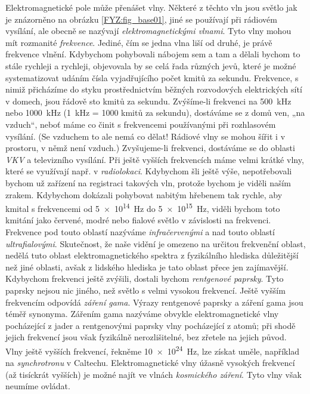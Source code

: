     Elektromagnetické pole může přenášet vlny. Některé z těchto vln jsou světlo jak je znázorněno na obrázku 
    \ref{FYZ:fig_base01}, jiné se používají při rádiovém vysílání, ale obecně se nazývají 
    \emph{elektromagnetickými vlnami}. Tyto vlny mohou mít rozmanité \emph{frekvence}. Jediné, čím se jedna 
    vlna liší od druhé, je právě frekvence vlnění. Kdybychom pohybovali nábojem sem a tam a dělali bychom to 
    stále rychleji a rychleji, objevovala by se celá řada různých jevů, které je možné systematizovat udáním 
    čísla vyjadřujícího počet kmitů za sekundu. Frekvence, s nimiž přicházíme do styku prostřednictvím 
    běžných rozvodových elektrických sítí v domech, jsou řádově sto kmitů za sekundu. Zvýšíme-li frekvenci na 
    \SI{500}{\kHz} nebo \SI{1000}{\kHz} (\SI{1}{\kHz} = 1000 kmitů za sekundu), dostáváme se z domů ven, „na 
    vzduch“, neboť máme co činit s frekvencemi používanými při rozhlasovém vysílání. (Se vzduchem to ale nemá 
    co dělat! Rádiové vlny se mohou šířit i v prostoru, v němž není vzduch.) Zvyšujeme-li frekvenci, 
    dostáváme se do oblasti \emph{VKV} a televizního vysílání. Při ještě vyšších frekvencích máme velmi 
    krátké vlny, které se využívají např. v \emph{radiolokaci}. Kdybychom šli ještě výše, nepotřebovali 
    bychom už zařízení na registraci takových vln, protože bychom je viděli naším zrakem. Kdybychom dokázali 
    pohybovat nabitým hřebenem tak rychle, aby kmital s frekvencemi od \SI{5e14}{\Hz} do \SI{5e15}{\Hz}, 
    viděli bychom toto kmitání jako červené, modré nebo fialové světlo v závislosti na frekvenci. Frekvence 
    pod touto oblastí nazýváme \emph{infračervenými} a nad touto oblastí \emph{ultrafialovými}. Skutečnost, 
    že naše vidění je omezeno na určitou frekvenční oblast, nedělá tuto oblast elektromagnetického spektra z 
    fyzikálního hlediska důležitější než jiné oblasti, avšak z lidského hlediska je tato oblast přece jen 
    zajímavější. Kdybychom frekvenci ještě zvýšili, dostali bychom \emph{rentgenové paprsky}. Tyto paprsky 
    nejsou nic jiného, než světlo s velmi vysokou frekvencí. Ještě vyšším frekvencím odpovídá \emph{záření 
    gama}. Výrazy rentgenové paprsky a záření gama jsou téměř synonyma. Zářením gama nazýváme obvykle 
    elektromagnetické vlny pocházející z jader a rentgenovými paprsky vlny pocházející z atomů; při shodě 
    jejich frekvencí jsou však fyzikálně nerozlišitelné, bez zřetele na jejich původ. Vlny ještě vyšších 
    frekvencí, řekněme \SI{10e24}{\Hz}, lze získat uměle, například na \emph{synchrotronu} v Caltechu. 
    Elektromagnetické vlny úžasně vysokých frekvencí (až tisíckrát vyšších) je možné najít ve vlnách 
    \emph{kosmického záření}. Tyto vlny však neumíme ovládat. \cite[s.~29]{Feynman02}
  
